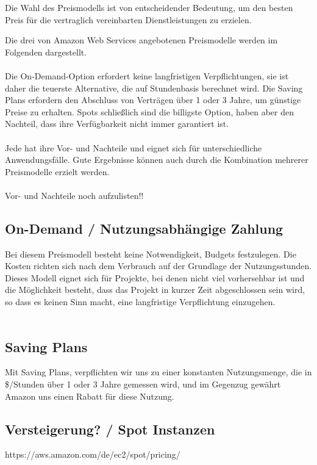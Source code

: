 Die Wahl des Preismodells ist von entscheidender Bedeutung, um den besten Preis für die vertraglich vereinbarten Dienstleistungen zu erzielen. 

Die drei von Amazon Web Services angebotenen Preismodelle werden im Folgenden dargestellt.
\\\\
Die On-Demand-Option erfordert keine langfristigen Verpflichtungen, sie ist daher die teuerste Alternative, die auf Stundenbasis berechnet wird. Die Saving Plans erfordern den Abschluss von Verträgen über 1 oder 3 Jahre, um günstige Preise zu erhalten. Spots schließlich sind die billigste Option, haben aber den Nachteil, dass ihre Verfügbarkeit nicht immer garantiert ist.
\\\\
Jede hat ihre Vor- und Nachteile und eignet sich für unterschiedliche Anwendungsfälle. Gute Ergebnisse können auch durch die Kombination mehrerer Preismodelle erzielt werden.  
\\\\
Vor- und Nachteile noch aufzulisten!!


\subsection{On-Demand / Nutzungsabhängige Zahlung}
Bei diesem Preismodell besteht keine Notwendigkeit, Budgets festzulegen. Die Kosten richten sich nach dem Verbrauch auf der Grundlage der Nutzungsstunden.
\\
Dieses Modell eignet sich für Projekte, bei denen nicht viel vorhersehbar ist und die Möglichkeit besteht, dass das Projekt in kurzer Zeit abgeschlossen sein wird, so dass es keinen Sinn macht, eine langfristige Verpflichtung einzugehen.
\\\\

\subsection{Saving Plans}
Mit Saving Plans, verpflichten wir uns zu einer konstanten Nutzungsmenge, die in \$/Stunden über 1 oder 3 Jahre gemessen wird, und im Gegenzug gewährt Amazon uns einen Rabatt für diese Nutzung.


\subsection{Versteigerung? / Spot Instanzen }
https://aws.amazon.com/de/ec2/spot/pricing/
